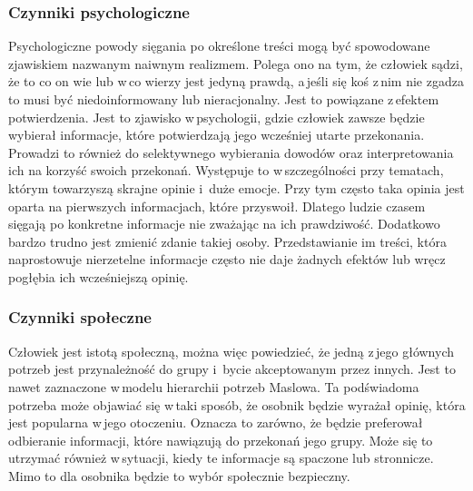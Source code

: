 \subsubsection{Czynniki psychologiczne}
Psychologiczne powody sięgania po określone treści mogą być spowodowane zjawiskiem nazwanym naiwnym realizmem. Polega ono na tym, że człowiek sądzi, że to co on wie lub w\,co wierzy jest jedyną prawdą, a\,jeśli się koś z\,nim nie zgadza to musi być niedoinformowany lub nieracjonalny. Jest to powiązane z\,efektem potwierdzenia. Jest to zjawisko w\,psychologii, gdzie człowiek zawsze będzie wybierał informacje, które potwierdzają jego wcześniej utarte przekonania. Prowadzi to również do selektywnego wybierania dowodów oraz interpretowania ich na korzyść swoich przekonań.  Występuje to w\,szczególności przy tematach, którym towarzyszą skrajne opinie i \,duże emocje. Przy tym często taka opinia jest oparta na pierwszych informacjach, które przyswoił. Dlatego ludzie czasem sięgają po konkretne informacje nie zważając na ich prawdziwość.  Dodatkowo bardzo trudno jest zmienić zdanie takiej osoby. Przedstawianie im treści, która naprostowuje nierzetelne informacje często nie daje żadnych efektów lub wręcz pogłębia ich wcześniejszą opinię. 

\subsubsection{Czynniki społeczne}
Człowiek jest istotą społeczną, można więc powiedzieć, że jedną z\,jego głównych potrzeb jest przynależność do grupy i \,bycie akceptowanym przez innych. Jest to nawet zaznaczone w\,modelu hierarchii potrzeb Maslowa. Ta podświadoma potrzeba może objawiać się w\,taki sposób, że osobnik będzie wyrażał opinię, która jest popularna w\,jego otoczeniu. Oznacza to zarówno, że będzie preferował odbieranie informacji, które nawiązują do przekonań jego grupy. Może się to utrzymać również w\,sytuacji, kiedy te informacje są spaczone lub stronnicze. Mimo to dla osobnika będzie to wybór społecznie bezpieczny.

